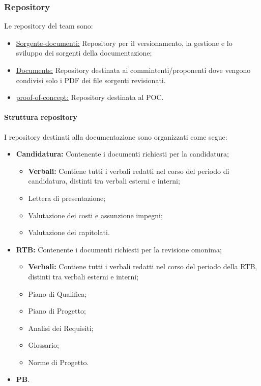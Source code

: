 \subsubsection{Repository}
Le repository del team sono:
\begin{itemize}
    \item \href{https://github.com/ByteOps-swe/Sorgente-documenti}{Sorgente-documenti:} Repository per il versionamento, la gestione e lo sviluppo dei sorgenti della documentazione;
    \item \href{https://github.com/ByteOps-swe/Documents}{Documents:} Repository destinata ai commintenti/proponenti dove vengono condivisi solo i PDF dei file sorgenti revisionati.
    \item \href{https://github.com/ByteOps-swe/proof-of-concept}{proof-of-concept:} Repository destinata al POC.
\end{itemize}
\paragraph{Struttura repository}
I repository destinati alla documentazione sono organizzati come segue:
\begin{itemize}
    \item \textbf{Candidatura:} Contenente i documenti richiesti per la candidatura;
          \begin{itemize}
              \item \textbf{Verbali:} Contiene tutti i verbali redatti nel corso del periodo di candidatura, distinti tra verbali esterni e interni;
              \item Lettera di presentazione;
              \item Valutazione dei costi e assunzione impegni;
              \item Valutazione dei capitolati.
          \end{itemize}
    \item \textbf{RTB:} Contenente i documenti richiesti per la revisione omonima;
          \begin{itemize}
              \item \textbf{Verbali:} Contiene tutti i verbali redatti nel corso del periodo della RTB, distinti tra verbali esterni e interni;
              \item Piano di Qualifica;
              \item Piano di Progetto;
              \item Analisi dei Requisiti;
              \item Glossario;
              \item Norme di Progetto.
          \end{itemize}
    \item \textbf{PB}.
\end{itemize}


